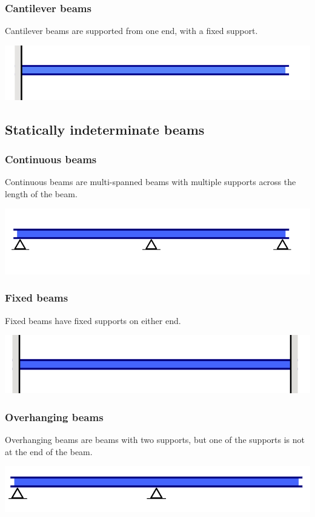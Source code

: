 \documentclass[11pt]{article}
\begin{document}
\subsubsection{Cantilever beams}
\label{sec:orgfd0c528}
Cantilever beams are supported from one end, with a fixed support.
\begin{center}
\includegraphics[width=.9\linewidth]{./images/cantilever-beam-type.png}
\end{center}
\subsection{Statically indeterminate beams}
\label{sec:org4024973}

\subsubsection{Continuous beams}
\label{sec:orga63f681}
Continuous beams are multi-spanned beams with multiple supports across the length of the beam.
\begin{center}
\includegraphics[width=.9\linewidth]{./images/continuous-beam-type.png}
\end{center}
\subsubsection{Fixed beams}
\label{sec:orgba4a761}
Fixed beams have fixed supports on either end.
\begin{center}
\includegraphics[width=.9\linewidth]{./images/fixed-beam-type.png}
\end{center}
\subsubsection{Overhanging beams}
\label{sec:org89593a1}
Overhanging beams are beams with two supports, but one of the supports is not at the end of the beam.
\begin{center}
\includegraphics[width=.9\linewidth]{./images/overhanging-beam-type.png}
\end{center}
\end{document}
